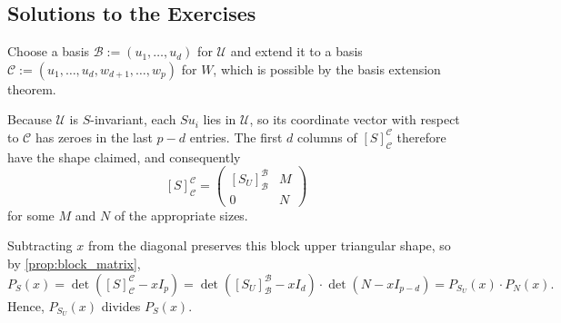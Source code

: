 \subsection{Solutions to the Exercises}
\label{sec:solutions_jordan_b}

\begin{exercisesolution}
\label{sol:char_poly_restriction_divides}
Choose a basis $\mathcal{B} := (u_1, \dots, u_d)$ for $\mathcal{U}$ and extend it to a basis $\mathcal{C} := (u_1, \dots, u_d, w_{d+1}, \dots, w_p)$ for $W$, which is possible by the basis extension theorem.

Because $\mathcal{U}$ is $S$-invariant, each $S u_i$ lies in $\mathcal{U}$, so its coordinate vector with respect to $\mathcal{C}$ has zeroes in the last $p - d$ entries. The first $d$ columns of $[S]_{\mathcal{C}}^{\mathcal{C}}$ therefore have the shape claimed, and consequently
\[
    [S]_{\mathcal{C}}^{\mathcal{C}} = \left(\begin{array}{c|c} [S_U]_{\mathcal{B}}^{\mathcal{B}} & M \\ \hline 0 & N \end{array}\right)
\]
for some $M$ and $N$ of the appropriate sizes.

Subtracting $x$ from the diagonal preserves this block upper triangular shape, so by \cref{prop:block_matrix},
\[
    P_S(x) = \det\left([S]_{\mathcal{C}}^{\mathcal{C}} - x I_p\right) = \det\left([S_U]_{\mathcal{B}}^{\mathcal{B}} - x I_d\right) \cdot \det\left(N - x I_{p-d}\right) = P_{S_U}(x) \cdot P_N(x).
\]
Hence, $P_{S_U}(x)$ divides $P_S(x)$.
\end{exercisesolution}

